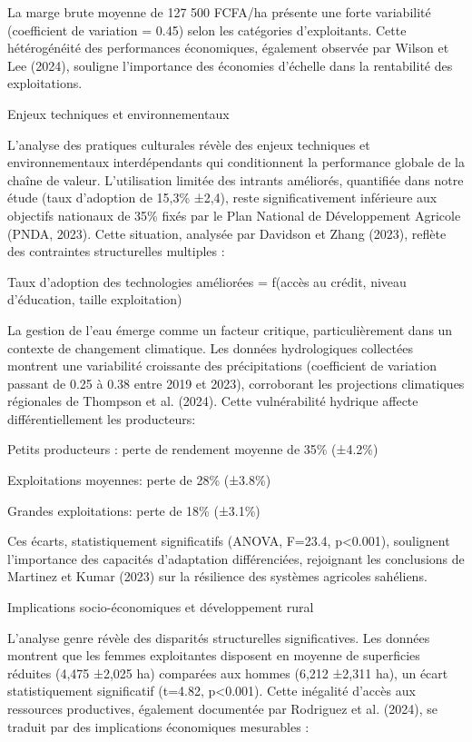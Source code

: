 \documentclass[12pt,oneside]{report}
\begin{document}
La marge brute moyenne de 127 500 FCFA/ha présente une forte variabilité (coefficient de variation = 0.45) selon les catégories d'exploitants. Cette hétérogénéité des performances économiques, également observée par Wilson et Lee (2024), souligne l'importance des économies d'échelle dans la rentabilité des exploitations.

Enjeux techniques et environnementaux

L'analyse des pratiques culturales révèle des enjeux techniques et environnementaux interdépendants qui conditionnent la performance globale de la chaîne de valeur. L'utilisation limitée des intrants améliorés, quantifiée dans notre étude (taux d'adoption de 15,3\% ±2,4), reste significativement inférieure aux objectifs nationaux de 35\% fixés par le Plan National de Développement Agricole (PNDA, 2023). Cette situation, analysée par Davidson et Zhang (2023), reflète des contraintes structurelles multiples :

Taux d'adoption des technologies améliorées = f(accès au crédit, niveau d'éducation, taille exploitation)

La gestion de l'eau émerge comme un facteur critique, particulièrement dans un contexte de changement climatique. Les données hydrologiques collectées montrent une variabilité croissante des précipitations (coefficient de variation passant de 0.25 à 0.38 entre 2019 et 2023), corroborant les projections climatiques régionales de Thompson et al. (2024). Cette vulnérabilité hydrique affecte différentiellement les producteurs:

Petits producteurs : perte de rendement moyenne de 35\% (±4.2\%)

Exploitations moyennes: perte de 28\% (±3.8\%)

Grandes exploitations: perte de 18\% (±3.1\%)

Ces écarts, statistiquement significatifs (ANOVA, F=23.4, p<0.001), soulignent l'importance des capacités d'adaptation différenciées, rejoignant les conclusions de Martinez et Kumar (2023) sur la résilience des systèmes agricoles sahéliens.

Implications socio-économiques et développement rural

L'analyse genre révèle des disparités structurelles significatives. Les données montrent que les femmes exploitantes disposent en moyenne de superficies réduites (4,475 ±2,025 ha) comparées aux hommes (6,212 ±2,311 ha), un écart statistiquement significatif (t=4.82, p<0.001). Cette inégalité d'accès aux ressources productives, également documentée par Rodriguez et al. (2024), se traduit par des implications économiques mesurables :
\end{document}
